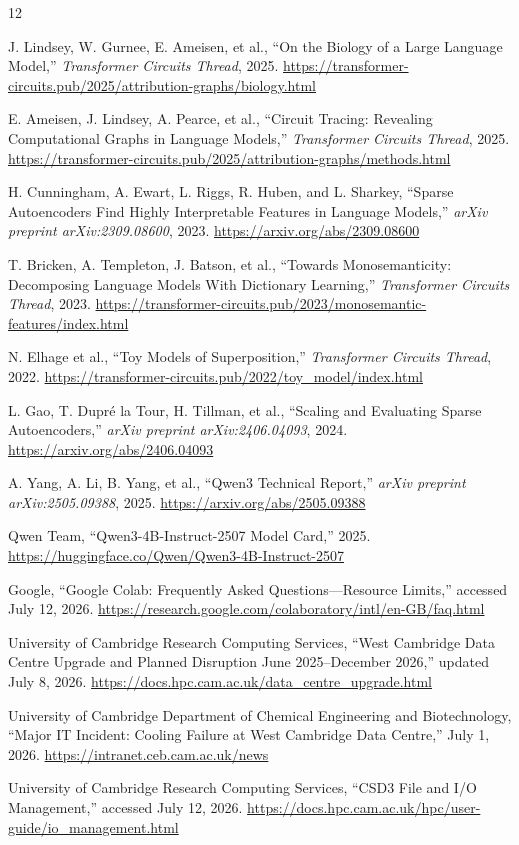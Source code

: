 \documentclass[11pt,a4paper]{article}
\begin{document}
\begin{thebibliography}{12}

 J. Lindsey, W. Gurnee, E. Ameisen, et al., ``On the Biology of a Large Language Model,''
\emph{Transformer Circuits Thread}, 2025.
\url{https://transformer-circuits.pub/2025/attribution-graphs/biology.html}

 E. Ameisen, J. Lindsey, A. Pearce, et al., ``Circuit Tracing: Revealing Computational Graphs in Language Models,''
\emph{Transformer Circuits Thread}, 2025.
\url{https://transformer-circuits.pub/2025/attribution-graphs/methods.html}

 H. Cunningham, A. Ewart, L. Riggs, R. Huben, and L. Sharkey, ``Sparse Autoencoders Find Highly Interpretable Features in Language Models,''
\emph{arXiv preprint arXiv:2309.08600}, 2023.
\url{https://arxiv.org/abs/2309.08600}

 T. Bricken, A. Templeton, J. Batson, et al., ``Towards Monosemanticity: Decomposing Language Models With Dictionary Learning,''
\emph{Transformer Circuits Thread}, 2023.
\url{https://transformer-circuits.pub/2023/monosemantic-features/index.html}

 N. Elhage et al., ``Toy Models of Superposition,''
\emph{Transformer Circuits Thread}, 2022.
\url{https://transformer-circuits.pub/2022/toy_model/index.html}

 L. Gao, T. Dupr\'e la Tour, H. Tillman, et al., ``Scaling and Evaluating Sparse Autoencoders,''
\emph{arXiv preprint arXiv:2406.04093}, 2024.
\url{https://arxiv.org/abs/2406.04093}

 A. Yang, A. Li, B. Yang, et al., ``Qwen3 Technical Report,''
\emph{arXiv preprint arXiv:2505.09388}, 2025.
\url{https://arxiv.org/abs/2505.09388}

 Qwen Team, ``Qwen3-4B-Instruct-2507 Model Card,'' 2025.
\url{https://huggingface.co/Qwen/Qwen3-4B-Instruct-2507}

 Google, ``Google Colab: Frequently Asked Questions---Resource Limits,'' accessed July 12, 2026.
\url{https://research.google.com/colaboratory/intl/en-GB/faq.html}

 University of Cambridge Research Computing Services, ``West Cambridge Data Centre Upgrade and Planned Disruption June 2025--December 2026,'' updated July 8, 2026.
\url{https://docs.hpc.cam.ac.uk/data_centre_upgrade.html}

 University of Cambridge Department of Chemical Engineering and Biotechnology, ``Major IT Incident: Cooling Failure at West Cambridge Data Centre,'' July 1, 2026.
\url{https://intranet.ceb.cam.ac.uk/news}

 University of Cambridge Research Computing Services, ``CSD3 File and I/O Management,'' accessed July 12, 2026.
\url{https://docs.hpc.cam.ac.uk/hpc/user-guide/io_management.html}

\end{thebibliography}
\end{document}
